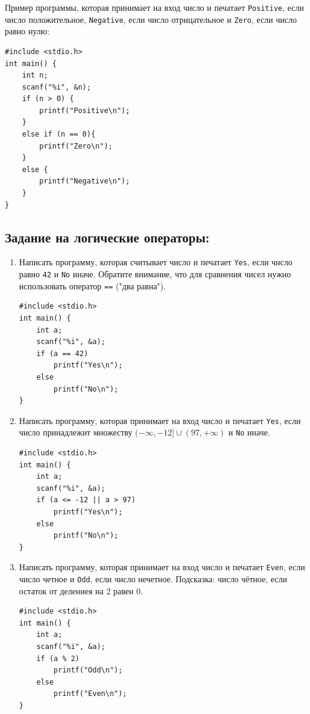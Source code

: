 \documentclass{article}
\begin{document}
Пример программы, которая принимает на вход число и печатает \texttt{Positive}, если число положительное, \texttt{Negative}, если число отрицательное и \texttt{Zero}, если число равно нулю:
\begin{lstlisting}
#include <stdio.h>
int main() {
    int n;
    scanf("%i", &n);
    if (n > 0) {
       	printf("Positive\n");
    }
    else if (n == 0){
    	printf("Zero\n");
    }
    else {
    	printf("Negative\n");
    }
}
\end{lstlisting}


\subsection*{Задание на логические операторы:}
\begin{enumerate}
\item Написать программу, которая считывает число и печатает \texttt{Yes}, если число равно \texttt{42} и \texttt{No} иначе. Обратите внимание, что для сравнения чисел нужно использовать оператор \texttt{==} ("два равна").
\begin{lstlisting}[backgroundcolor = \color{solcolor}]
#include <stdio.h>
int main() {
	int a;
	scanf("%i", &a);
	if (a == 42)
		printf("Yes\n");
	else
		printf("No\n");
}
\end{lstlisting}
\item Написать программу, которая принимает на вход число и печатает \texttt{Yes}, если число принадлежит множеству $(-\infty, -12] \cup (97, +\infty)$  и \texttt{No} иначе.
\begin{lstlisting}[backgroundcolor = \color{solcolor}]
#include <stdio.h>
int main() {
	int a;
	scanf("%i", &a);
	if (a <= -12 || a > 97)
		printf("Yes\n");
	else
		printf("No\n");
}
\end{lstlisting}
\item Написать программу, которая принимает на вход число и печатает \texttt{Even}, если число четное и \texttt{Odd}, если число нечетное. Подсказка: число чётное, если остаток от делениея на 2 равен 0.
\begin{lstlisting}[backgroundcolor = \color{solcolor}]
#include <stdio.h>
int main() {
	int a;
	scanf("%i", &a);
	if (a % 2)
		printf("Odd\n");
	else
		printf("Even\n");
}
\end{lstlisting}


\end{enumerate}
\end{document}
